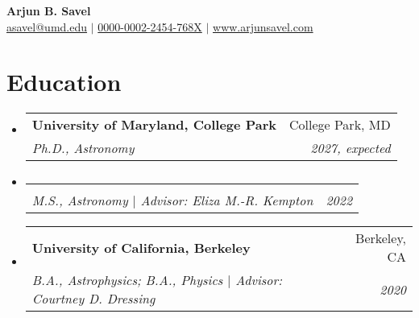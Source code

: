 \documentclass[letterpaper,12pt]{article}
\makeatletter
\newcommand{\resumeItem}[2]{
  \item\small{
    \textbf{#1}{#2 \vspace{-2pt}}
  }
}
\newcommand{\resumeItemNoBullet}[2]{
  \item[]\small{
    \hspace{-9pt}\textbf{#1}{: #2 \vspace{-6pt}}
  }
}
\newcommand{\resumeSubheading}[4]{
  \vspace{-1pt}\item[]
  \begin{tabular*}{0.98\textwidth}{l@{\extracolsep{\fill}}r}
      \hspace{-10pt}\textbf{#1} & #2 \\
      \hspace{-10pt}\textit{\small#3} & \textit{\small #4} \\
    \end{tabular*}\vspace{-5pt}
}
\newcommand{\resumeSubHeadingListStart}{\begin{itemize}[leftmargin=*]}
\newcommand{\resumeSubHeadingListEnd}{\end{itemize}}
\newcommand{\resumeItemListStart}{\begin{itemize}}
\newcommand{\shorterSection}[1]{\vspace{-10pt}\section{#1}}
\makeatother
\begin{document}
\thispagestyle{empty}

\begin{center}
  \small \textbf{\large Arjun B. Savel} \\
  \textsf{\small \href{href="mailto:asavel@umd.edu"}{asavel@umd.edu}} $\vert$   \href{https://orcid.org/0000-0002-2454-768X/}{0000-0002-2454-768X} $\vert$ \href{www.arjunsavel.com}{www.arjunsavel.com}
\end{center}
\vspace{-20pt}
\shorterSection{Education}
  \resumeSubHeadingListStart
    \resumeSubheading
      {University of Maryland, College Park}{College Park, MD}
      {Ph.D., Astronomy}{2027, expected}{
    }
    \vspace{-37pt}
    \resumeSubheading
    {}{}{M.S., Astronomy $\vert$ Advisor: Eliza M.-R. Kempton}{2022}{
    }
    \vspace{-20pt}
    \resumeSubheading
      {University of California, Berkeley}{Berkeley, CA}
      {B.A., Astrophysics; B.A., Physics $\vert$ Advisor: Courtney D. Dressing}{2020}{
    }

  \resumeSubHeadingListEnd


\vspace{-12pt}
\end{document}
